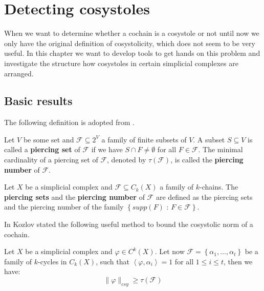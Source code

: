 
\chapter{Detecting cosystoles}

\label{Chapter2}

When we want to determine whether a cochain is a cosystole or not until now we only have the original definition of cosystolicity, which does not seem to be very useful. In this chapter we want to develop tools to get hands on this problem and investigate the structure how cosystoles in certain simplicial complexes are arranged.

\section{Basic results}

The following definition is adopted from \cite{6}.

\begin{defi}
Let \(V\) be some set and \(\mathcal{F}\subseteq 2^V\) a family of finite subsets of \(V\). A subset \(S\subseteq V\) is called a \textbf{piercing set} of \(\mathcal{F}\) if we have \(S\cap F\neq\emptyset\) for all \(F\in\mathcal{F}\). The minimal cardinality of a piercing set of \(\mathcal{F}\), denoted by \(\tau(\mathcal{F})\), is called the \textbf{piercing number} of \(\mathcal{F}\).
\end{defi}

\begin{defi}
Let \(X\) be a simplicial complex and \(\mathcal{F}\subseteq C_k(X)\) a family of \(k\)-chains. The \textbf{piercing sets} and the \textbf{piercing number} of \(\mathcal{F}\) are defined as the piercing sets and the piercing number of the family \(\left\{supp(F)\text{ : }F\in\mathcal{F}\right\}\).
\end{defi}

In \cite{6} Kozlov stated the following useful method to bound the cosystolic norm of a cochain.

\begin{thm}\label{theorem9}
Let \(X\) be a simplicial complex and \(\varphi\in C^k(X)\). Let now \(\mathcal{F}=\left\{\alpha_1,\ldots,\alpha_t\right\}\) be a family of \(k\)-cycles in \(C_k(X)\), such that \(\left\langle\varphi,\alpha_i\right\rangle=1\) for all \(1\leq i\leq t\), then we have:
\[
\|\varphi\|_{csy}\geq\tau(\mathcal{F})
\]
\end{thm}

